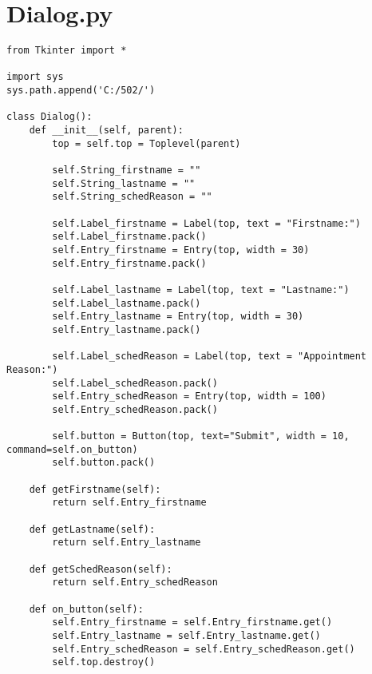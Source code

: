 \documentclass[12pt]{book}
\begin{document}
\section{Dialog.py}
\label{sec-37-3}

\lstset{language=Python,label= ,caption= ,numbers=none}
\begin{lstlisting}
from Tkinter import *

import sys
sys.path.append('C:/502/')

class Dialog():
    def __init__(self, parent):
        top = self.top = Toplevel(parent)

        self.String_firstname = ""
        self.String_lastname = ""
        self.String_schedReason = ""

        self.Label_firstname = Label(top, text = "Firstname:")
        self.Label_firstname.pack()
        self.Entry_firstname = Entry(top, width = 30)
        self.Entry_firstname.pack()

        self.Label_lastname = Label(top, text = "Lastname:")
        self.Label_lastname.pack()
        self.Entry_lastname = Entry(top, width = 30)
        self.Entry_lastname.pack()

        self.Label_schedReason = Label(top, text = "Appointment Reason:")
        self.Label_schedReason.pack()
        self.Entry_schedReason = Entry(top, width = 100)
        self.Entry_schedReason.pack()

        self.button = Button(top, text="Submit", width = 10, command=self.on_button)
        self.button.pack()

    def getFirstname(self):
        return self.Entry_firstname

    def getLastname(self):
        return self.Entry_lastname

    def getSchedReason(self):
        return self.Entry_schedReason

    def on_button(self):
        self.Entry_firstname = self.Entry_firstname.get()
        self.Entry_lastname = self.Entry_lastname.get()
        self.Entry_schedReason = self.Entry_schedReason.get()
        self.top.destroy()
\end{lstlisting}
\end{document}

